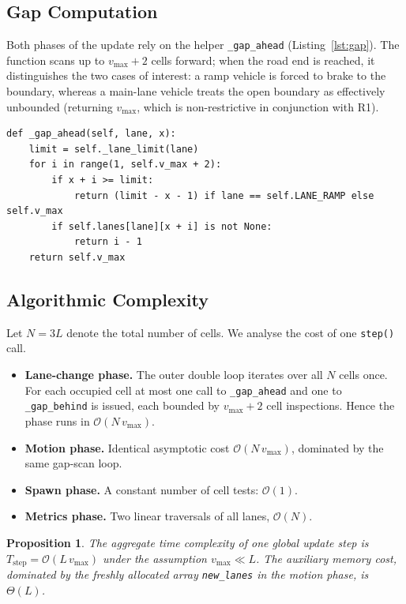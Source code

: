 \documentclass[11pt,a4paper]{article}
\newtheorem{proposition}{Proposition}
\begin{document}
\subsection{Gap Computation}

Both phases of the update rely on the helper \texttt{\_gap\_ahead}
(Listing~\ref{lst:gap}). The function scans up to $v_{\max}+2$ cells
forward; when the road end is reached, it distinguishes the two cases of
interest: a ramp vehicle is forced to brake to the boundary, whereas a
main-lane vehicle treats the open boundary as effectively unbounded
(returning $v_{\max}$, which is non-restrictive in conjunction with R1).

\begin{lstlisting}[caption={Forward-gap computation.},label={lst:gap}]
def _gap_ahead(self, lane, x):
    limit = self._lane_limit(lane)
    for i in range(1, self.v_max + 2):
        if x + i >= limit:
            return (limit - x - 1) if lane == self.LANE_RAMP else self.v_max
        if self.lanes[lane][x + i] is not None:
            return i - 1
    return self.v_max
\end{lstlisting}

\subsection{Algorithmic Complexity}
\label{sec:complexity}

Let $N=3L$ denote the total number of cells. We analyse the cost of one
\texttt{step()} call.
\begin{itemize}[leftmargin=1.6em]
\item \textbf{Lane-change phase.} The outer double loop iterates over all
      $N$ cells once. For each occupied cell at most one call to
      \texttt{\_gap\_ahead} and one to \texttt{\_gap\_behind} is issued,
      each bounded by $v_{\max}+2$ cell inspections. Hence the phase
      runs in $\mathcal{O}(N\,v_{\max})$.
\item \textbf{Motion phase.} Identical asymptotic cost
      $\mathcal{O}(N\,v_{\max})$, dominated by the same gap-scan loop.
\item \textbf{Spawn phase.} A constant number of cell tests:
      $\mathcal{O}(1)$.
\item \textbf{Metrics phase.} Two linear traversals of all lanes,
      $\mathcal{O}(N)$.
\end{itemize}
\begin{proposition}\label{prop:complexity}
The aggregate time complexity of one global update step is
$T_{\text{step}} = \mathcal{O}(L\,v_{\max})$
under the assumption $v_{\max}\ll L$. The auxiliary memory cost,
dominated by the freshly allocated array \texttt{new\_lanes} in the
motion phase, is $\Theta(L)$.
\end{proposition}
\end{document}
